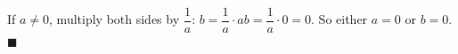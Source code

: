 If $a\ne0$, multiply both sides by $\dfrac1a$: $b=\dfrac1a\cdot ab=\dfrac1a\cdot0=0$. So either $a=0$ or $b=0$. $\blacksquare$
